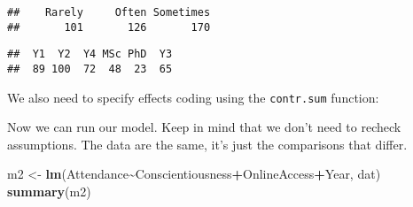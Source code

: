 \documentclass[
]{article}
\newenvironment{Shaded}{\begin{snugshade}}{\end{snugshade}}
\newcommand{\AttributeTok}[1]{\textcolor[rgb]{0.13,0.29,0.53}{#1}}
\newcommand{\FunctionTok}[1]{\textcolor[rgb]{0.13,0.29,0.53}{\textbf{#1}}}
\newcommand{\NormalTok}[1]{#1}
\newcommand{\OtherTok}[1]{\textcolor[rgb]{0.56,0.35,0.01}{#1}}
\newcommand{\SpecialCharTok}[1]{\textcolor[rgb]{0.81,0.36,0.00}{\textbf{#1}}}
\newcommand{\StringTok}[1]{\textcolor[rgb]{0.31,0.60,0.02}{#1}}
\begin{document}
\begin{verbatim}
##    Rarely     Often Sometimes 
##       101       126       170
\end{verbatim}

\begin{Shaded}
\end{Shaded}

\begin{verbatim}
##  Y1  Y2  Y4 MSc PhD  Y3 
##  89 100  72  48  23  65
\end{verbatim}

We also need to specify effects coding using the \texttt{contr.sum} function:

\begin{Shaded}
\end{Shaded}

Now we can run our model. Keep in mind that we don't need to recheck assumptions. The data are the same, it's just the comparisons that differ.

\begin{Shaded}
\begin{Highlighting}[]
\NormalTok{m2 }\OtherTok{\textless{}{-}} \FunctionTok{lm}\NormalTok{(Attendance}\SpecialCharTok{\textasciitilde{}}\NormalTok{Conscientiousness}\SpecialCharTok{+}\NormalTok{OnlineAccess}\SpecialCharTok{+}\NormalTok{Year, dat)}
\FunctionTok{summary}\NormalTok{(m2)}
\end{Highlighting}
\end{Shaded}
\end{document}
